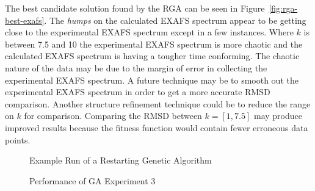 The best candidate solution found by the RGA can be seen in Figure~\ref{fig:rga-best-exafs}. The \textit{humps} on the calculated EXAFS spectrum appear to be getting close to the experimental EXAFS spectrum except in a few instances. Where $k$ is between 7.5 and 10 the experimental EXAFS spectrum is more chaotic and the calculated EXAFS spectrum is having a tougher time conforming. The chaotic nature of the data may be due to the margin of error in collecting the experimental EXAFS spectrum. A future technique may be to smooth out the experimental EXAFS spectrum in order to get a more accurate RMSD comparison. Another structure refinement technique could be to reduce the range on $k$ for comparison. Comparing the RMSD between $k = [1,7.5]$ may produce improved results because the fitness function would contain fewer erroneous data points.

\begin{figure}
	\centering
	\caption{Example Run of a Restarting Genetic Algorithm}
	\label{fig:rga-generational-data}
\end{figure}

\begin{figure}
	\centering
	\caption{Performance of GA Experiment 3}
	\label{fig:ga-generational-data-avg}
\end{figure}

